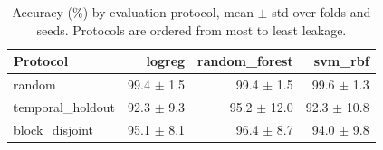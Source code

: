 \begin{table}[t]
\centering
\caption{Accuracy (\%) by evaluation protocol, mean $\pm$ std over folds and seeds. Protocols are ordered from most to least leakage.}
\label{tab:protocol}
\begin{tabular}{lrrr}
\toprule
Protocol & logreg & random_forest & svm_rbf \\
\midrule
random & 99.4 $\pm$ 1.5 & 99.4 $\pm$ 1.5 & 99.6 $\pm$ 1.3 \\
temporal\_holdout & 92.3 $\pm$ 9.3 & 95.2 $\pm$ 12.0 & 92.3 $\pm$ 10.8 \\
block\_disjoint & 95.1 $\pm$ 8.1 & 96.4 $\pm$ 8.7 & 94.0 $\pm$ 9.8 \\
\bottomrule
\end{tabular}
\end{table}